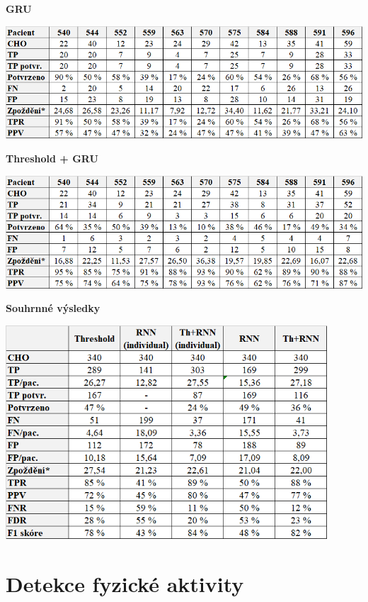 \begin{table}[H]
\caption{\textbf{GRU}}
\vspace*{1mm}
\label{tab:vys:rnn}
\centering
\includegraphics[width=1\textwidth]{img/vysledky/cho/4_rnn.png}
\end{table}

\begin{table}[H]
\caption{\textbf{Threshold + GRU}}
\label{tab:vys:thrnn}
\centering
\includegraphics[width=1\textwidth]{img/vysledky/cho/5_thrnn.png}
\end{table}

\begin{table}[H]
\caption{\textbf{Souhrnné výsledky}}
\label{tab:vys:sum_cho}
\centering
\includegraphics[width=0.9\textwidth]{img/vysledky/cho/cho.png}
\end{table}



\section*{Detekce fyzické aktivity}
